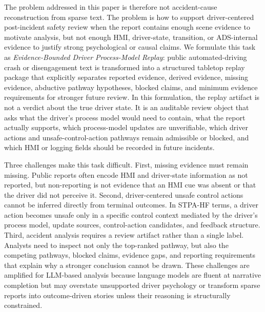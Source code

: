 The problem addressed in this paper is therefore not accident-cause reconstruction from sparse text. The problem is how to support driver-centered post-incident safety review when the report contains enough scene evidence to motivate analysis, but not enough HMI, driver-state, transition, or ADS-internal evidence to justify strong psychological or causal claims. We formulate this task as \emph{Evidence-Bounded Driver Process-Model Replay}: public automated-driving crash or disengagement text is transformed into a structured tabletop replay package that explicitly separates reported evidence, derived evidence, missing evidence, abductive pathway hypotheses, blocked claims, and minimum evidence requirements for stronger future review. In this formulation, the replay artifact is not a verdict about the true driver state. It is an auditable review object that asks what the driver's process model would need to contain, what the report actually supports, which process-model updates are unverifiable, which driver actions and unsafe-control-action pathways remain admissible or blocked, and which HMI or logging fields should be recorded in future incidents.

Three challenges make this task difficult. First, missing evidence must remain missing. Public reports often encode HMI and driver-state information as not reported, but non-reporting is not evidence that an HMI cue was absent or that the driver did not perceive it. Second, driver-centered unsafe control actions cannot be inferred directly from terminal outcomes. In STPA-HF terms, a driver action becomes unsafe only in a specific control context mediated by the driver's process model, update sources, control-action candidates, and feedback structure. Third, accident analysis requires a review artifact rather than a single label. Analysts need to inspect not only the top-ranked pathway, but also the competing pathways, blocked claims, evidence gaps, and reporting requirements that explain why a stronger conclusion cannot be drawn. These challenges are amplified for LLM-based analysis because language models are fluent at narrative completion but may overstate unsupported driver psychology or transform sparse reports into outcome-driven stories unless their reasoning is structurally constrained.

